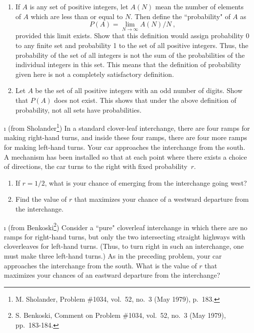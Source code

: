 \begin{LJSItem}
\begin{enumerate}
\item If $A$ is any set of positive integers, let $A(N)$ mean the number
of elements of $A$ which are less than or equal to $N$.  Then define the
``probability" of $A$ as 
$$
P(A) = \lim_{N \to \infty} A(N)/N\ ,
$$
provided this limit exists.  Show that this definition would assign
probability 0 to any finite set and probability 1 to the set of all positive integers. 
Thus, the probability of the set of all integers is not the sum of the
probabilities of the individual integers in this set.  This means that the
definition of probability given here is not a completely satisfactory
definition.

\item Let $A$ be the set of all positive integers with an odd number of digits.
Show that $P(A)$ does not exist.  This shows that under the above definition
of probability, not all sets have probabilities.

\end{enumerate}


\i\label{exer 1.2.28}
(from Sholander\footnote{M. Sholander, Problem \#1034,  vol.~52,
no.\ 3 (May 1979), p.~183.}) In a standard
clover-leaf interchange, there are four ramps for making right-hand turns, and inside these
four ramps, there are four more ramps for making left-hand turns.  Your car approaches the
interchange from the south.  A mechanism has been installed so that at each point where there
exists a choice of directions, the car turns to the right with fixed probability~$r$. 
\begin{enumerate}
\item
If $r = 1/2$, what is your chance of emerging from the interchange going west?
\item
Find the value of $r$ that maximizes your chance of a westward departure from the interchange.
\end{enumerate}

\i\label{exer 1.2.29}
(from Benkoski\footnote{S. Benkoski, Comment on Problem \#1034, 
vol.~52, no.\ 3 (May 1979), pp.~183-184.}) Consider a ``pure" cloverleaf
interchange in which there are no ramps for right-hand turns, but only the two intersecting
straight highways with cloverleaves for left-hand turns.  (Thus, to turn right in such an
interchange, one must make three left-hand turns.)  As in the preceding problem, your car
approaches the interchange from the south.  What is the value of $r$ that maximizes your
chances of an eastward departure from the interchange?


\end{LJSItem}
